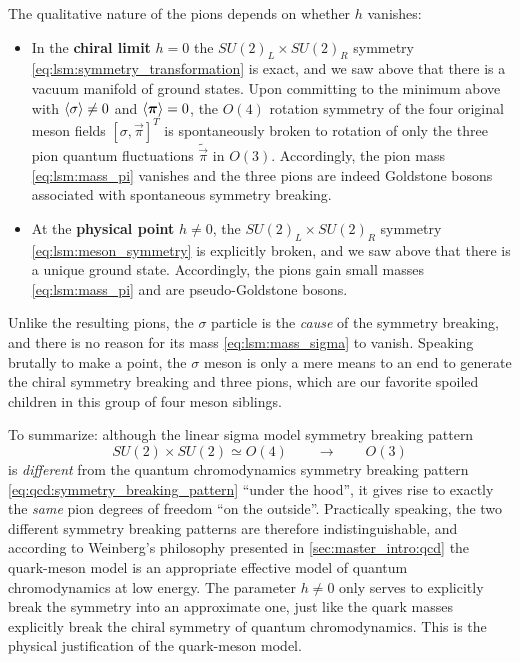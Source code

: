 The qualitative nature of the pions depends on whether $h$ vanishes:
\begin{itemize}
\item In the \textbf{chiral limit} $h = 0$ the $SU(2)_L \times SU(2)_R$ symmetry \eqref{eq:lsm:symmetry_transformation} is exact,
      and we saw above that there is a vacuum manifold of ground states.
      Upon committing to the minimum above with $\langle \sigma \rangle \neq 0$ and $\langle {\bm{\pi}} \rangle = 0$, the $O(4)$ rotation symmetry of the four original meson fields $[\sigma,\vec\pi]^T$ is spontaneously broken
      to rotation of only the three pion quantum fluctuations $\tilde{\vec\pi}$ in $O(3)$.
      Accordingly, the pion mass \eqref{eq:lsm:mass_pi} vanishes and the three pions are indeed Goldstone bosons associated with spontaneous symmetry breaking.
\item At the \textbf{physical point} $h \neq 0$, the $SU(2)_L \times SU(2)_R$ symmetry \eqref{eq:lsm:meson_symmetry} is explicitly broken,
      and we saw above that there is a unique ground state.
      Accordingly, the pions gain small masses \eqref{eq:lsm:mass_pi} and are pseudo-Goldstone bosons.
\end{itemize}
\label{elaborate on mexican hat analogy, brim, tip/tilt, etc.}
Unlike the resulting pions, the $\sigma$ particle is the \emph{cause} of the symmetry breaking,
and there is no reason for its mass \eqref{eq:lsm:mass_sigma} to vanish.
Speaking brutally to make a point, the $\sigma$ meson is only a mere means to an end to generate the chiral symmetry breaking and three pions,
which are our favorite spoiled children in this group of four meson siblings.

To summarize: although the linear sigma model symmetry breaking pattern
\begin{equation}
	SU(2) \times SU(2) \simeq O(4) \qquad \longrightarrow \qquad O(3)
\end{equation}
is \emph{different} from the quantum chromodynamics symmetry breaking pattern \eqref{eq:qcd:symmetry_breaking_pattern} ``under the hood'',
it gives rise to exactly the \emph{same} pion degrees of freedom ``on the outside''.
Practically speaking, the two different symmetry breaking patterns are therefore indistinguishable,
and according to Weinberg's philosophy presented in \cref{sec:master_intro:qcd}
the quark-meson model is an appropriate effective model of quantum chromodynamics at low energy.
The parameter $h \neq 0$ only serves to explicitly break the symmetry into an approximate one,
just like the quark masses explicitly break the chiral symmetry of quantum chromodynamics.
This is the physical justification of the quark-meson model.

